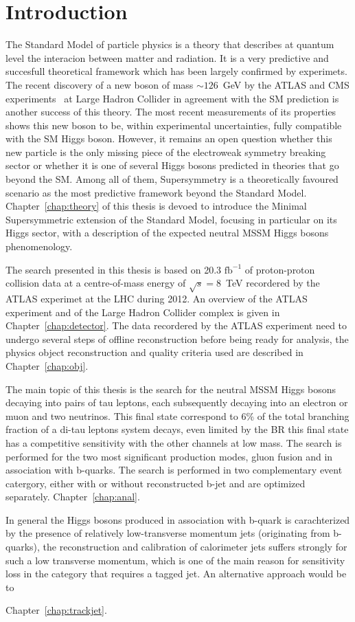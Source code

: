 \chapter{Introduction}

 
The Standard Model of particle physics is a theory that describes at quantum level the interacion 
between matter and radiation. It is a very predictive and succesfull theoretical framework
which has been largely confirmed by experimets.  The recent discovery of a new boson of mass
$\sim 126$~GeV by the ATLAS and CMS experiments~\cite{AHiggsO,CHiggsO} at Large Hadron Collider 
in agreement with the SM prediction is another success of this theory.
The most recent measurements \cite{ASpin0,ACouplings,CFermions,CWidth} of its
properties shows this new boson to be, within experimental uncertainties, fully
compatible with the SM Higgs boson. However, it remains an open question
whether this new particle is the only missing piece of the electroweak symmetry breaking
sector or whether it is one of several Higgs bosons predicted in  theories 
that go beyond the SM. Among all of them, Supersymmetry  is a theoretically favoured scenario
as the most predictive framework beyond the Standard Model. Chapter~\ref{chap:theory} of this thesis 
is devoed to introduce the Minimal Supersymmetric extension of the Standard Model, focusing 
in particular on its Higgs sector, with a description of the expected neutral MSSM Higgs bosons
phenomenology.

The search presented in this thesis is based on 20.3 $\text{fb}^{-1}$ of proton-proton collision data at 
a centre-of-mass energy of $\sqrt{s} = 8$~TeV recordered by the ATLAS experimet at the LHC during 2012.
An overview of the ATLAS experiment and of the Large Hadron Collider complex is given in Chapter~\ref{chap:detector}. 
The data recordered by the ATLAS experiment need to undergo several steps of offline reconstruction 
before being ready for analysis, the physics object reconstruction and quality criteria used are described in 
Chapter~\ref{chap:obj}.

The main topic of this thesis is the search for the neutral MSSM Higgs bosons decaying into pairs of tau leptons,
each subsequently decaying into an electron or muon and two neutrinos.
This final state correspond to 6\% of the total branching fraction of a di-tau leptons system decays, even limited by the BR
this final state has a competitive sensitivity with the other channels at low mass.
The search is performed for the two most significant production modes, gluon fusion and in association with
b-quarks. The search is performed in two complementary event catergory, either with or without reconstructed b-jet
and are optimized separately. Chapter~\ref{chap:anal}.

In general the Higgs bosons produced in association with b-quark is carachterized by the presence of relatively low-transverse momentum
jets (originating from b-quarks), the reconstruction and calibration of calorimeter jets suffers strongly for such a low transverse
momentum, which is one of the main reason for sensitivity loss in the category that requires a tagged jet.
An alternative approach would be to 

Chapter~\ref{chap:trackjet}.

